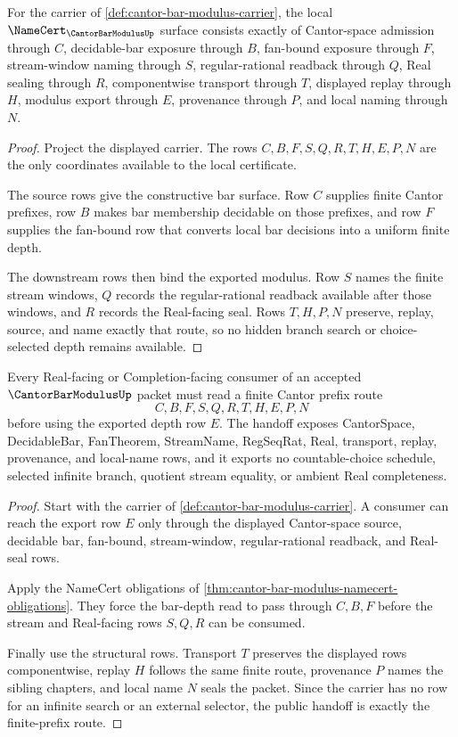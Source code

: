 \begin{theorem}
\label{thm:cantor-bar-modulus-namecert-obligations}
For the carrier of \autoref{def:cantor-bar-modulus-carrier}, the local $\NameCert_{\CantorBarModulusUp}$ surface consists exactly of Cantor-space admission through $C$, decidable-bar exposure through $B$, fan-bound exposure through $F$, stream-window naming through $S$, regular-rational readback through $Q$, Real sealing through $R$, componentwise transport through $T$, displayed replay through $H$, modulus export through $E$, provenance through $P$, and local naming through $N$.
\end{theorem}
\begin{proof}
Project the displayed carrier. The rows $C,B,F,S,Q,R,T,H,E,P,N$ are the only coordinates available to the local certificate.

The source rows give the constructive bar surface. Row $C$ supplies finite Cantor prefixes, row $B$ makes bar membership decidable on those prefixes, and row $F$ supplies the fan-bound row that converts local bar decisions into a uniform finite depth.

The downstream rows then bind the exported modulus. Row $S$ names the finite stream windows, $Q$ records the regular-rational readback available after those windows, and $R$ records the Real-facing seal. Rows $T,H,P,N$ preserve, replay, source, and name exactly that route, so no hidden branch search or choice-selected depth remains available.
\end{proof}

\begin{theorem}
\label{thm:cantor-bar-modulus-finite-branch-handoff}
Every Real-facing or Completion-facing consumer of an accepted $\CantorBarModulusUp$ packet must read a finite Cantor prefix route
$$
C,B,F,S,Q,R,T,H,E,P,N
$$
before using the exported depth row $E$. The handoff exposes CantorSpace, DecidableBar, FanTheorem, StreamName, RegSeqRat, Real, transport, replay, provenance, and local-name rows, and it exports no countable-choice schedule, selected infinite branch, quotient stream equality, or ambient Real completeness.
\end{theorem}
\begin{proof}
Start with the carrier of \autoref{def:cantor-bar-modulus-carrier}. A consumer can reach the export row $E$ only through the displayed Cantor-space source, decidable bar, fan-bound, stream-window, regular-rational readback, and Real-seal rows.

Apply the NameCert obligations of \autoref{thm:cantor-bar-modulus-namecert-obligations}. They force the bar-depth read to pass through $C,B,F$ before the stream and Real-facing rows $S,Q,R$ can be consumed.

Finally use the structural rows. Transport $T$ preserves the displayed rows componentwise, replay $H$ follows the same finite route, provenance $P$ names the sibling chapters, and local name $N$ seals the packet. Since the carrier has no row for an infinite search or an external selector, the public handoff is exactly the finite-prefix route.
\end{proof}

